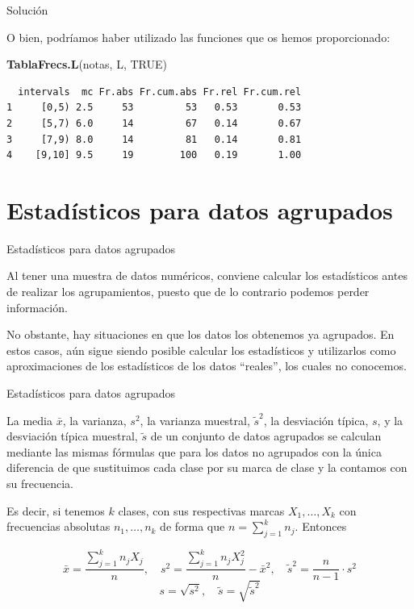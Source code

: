 \documentclass[
  ignorenonframetext,
]{beamer}
\newenvironment{Shaded}{\begin{snugshade}}{\end{snugshade}}
\newcommand{\KeywordTok}[1]{\textcolor[rgb]{0.13,0.29,0.53}{\textbf{#1}}}
\newcommand{\NormalTok}[1]{#1}
\newcommand{\OtherTok}[1]{\textcolor[rgb]{0.56,0.35,0.01}{#1}}
\begin{document}
\begin{frame}[fragile]{Solución}
\protect\hypertarget{soluciuxf3n-29}{}

O bien, podríamos haber utilizado las funciones que os hemos
proporcionado:

\begin{Shaded}
\begin{Highlighting}[]
\KeywordTok{TablaFrecs.L}\NormalTok{(notas, L, }\OtherTok{TRUE}\NormalTok{)}
\end{Highlighting}
\end{Shaded}

\begin{verbatim}
  intervals  mc Fr.abs Fr.cum.abs Fr.rel Fr.cum.rel
1     [0,5) 2.5     53         53   0.53       0.53
2     [5,7) 6.0     14         67   0.14       0.67
3     [7,9) 8.0     14         81   0.14       0.81
4    [9,10] 9.5     19        100   0.19       1.00
\end{verbatim}

\end{frame}

\hypertarget{estaduxedsticos-para-datos-agrupados}{%
\section{Estadísticos para datos
agrupados}\label{estaduxedsticos-para-datos-agrupados}}

\begin{frame}{Estadísticos para datos agrupados}
\protect\hypertarget{estaduxedsticos-para-datos-agrupados-1}{}

Al tener una muestra de datos numéricos, conviene calcular los
estadísticos antes de realizar los agrupamientos, puesto que de lo
contrario podemos perder información.

No obstante, hay situaciones en que los datos los obtenemos ya
agrupados. En estos casos, aún sigue siendo posible calcular los
estadísticos y utilizarlos como aproximaciones de los estadísticos de
los datos ``reales'', los cuales no conocemos.

\end{frame}

\begin{frame}{Estadísticos para datos agrupados}
\protect\hypertarget{estaduxedsticos-para-datos-agrupados-2}{}

La media \(\bar{x}\), la varianza, \(s^2\), la varianza muestral,
\(\tilde{s}^2\), la desviación típica, \(s\), y la desviación típica
muestral, \(\tilde{s}\) de un conjunto de datos agrupados se calculan
mediante las mismas fórmulas que para los datos no agrupados con la
única diferencia de que sustituimos cada clase por su marca de clase y
la contamos con su frecuencia.

Es decir, si tenemos \(k\) clases, con sus respectivas marcas
\(X_1,\dots,X_k\) con frecuencias absolutas \(n_1,\dots,n_k\) de forma
que \(n=\sum_{j=1}^kn_j\). Entonces

\[\bar{x}=\frac{\sum_{j=1}^kn_jX_j}{n},\quad s^2=\frac{\sum_{j=1}^kn_jX_j^2}{n}-\bar{x}^2,\quad \tilde{s}^2=\frac{n}{n-1}\cdot s^2\]
\[s=\sqrt{s^2},\quad \tilde{s}=\sqrt{\tilde{s}^2}\]

\end{frame}
\end{document}
